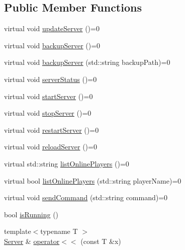\subsection*{Public Member Functions}
\begin{DoxyCompactItemize}
\item 
virtual void \hyperlink{class_minecraft_server_service_1_1_server_a0715bfc451f5abbd2f47d0895e5a2355}{update\+Server} ()=0
\item 
virtual void \hyperlink{class_minecraft_server_service_1_1_server_a58373fb195d9546e4a843ba83d741f36}{backup\+Server} ()=0
\item 
virtual void \hyperlink{class_minecraft_server_service_1_1_server_a3045f178ed407b157a21da66a245e61f}{backup\+Server} (std\+::string backup\+Path)=0
\item 
virtual void \hyperlink{class_minecraft_server_service_1_1_server_af972c950277b436d85513ff5e8003df2}{server\+Status} ()=0
\item 
virtual void \hyperlink{class_minecraft_server_service_1_1_server_ac84f4a395d9680ba4d7405996dcb445c}{start\+Server} ()=0
\item 
virtual void \hyperlink{class_minecraft_server_service_1_1_server_a45fb906a041e3f6c59128a0e9c4cd289}{stop\+Server} ()=0
\item 
virtual void \hyperlink{class_minecraft_server_service_1_1_server_a9cfcad805db7ffd3f5ad10ef7a726cf9}{restart\+Server} ()=0
\item 
virtual void \hyperlink{class_minecraft_server_service_1_1_server_a68757647a604e935d365672b53c82d98}{reload\+Server} ()=0
\item 
virtual std\+::string \hyperlink{class_minecraft_server_service_1_1_server_a86455e8351ecc7af502e681daf023eb3}{list\+Online\+Players} ()=0
\item 
virtual bool \hyperlink{class_minecraft_server_service_1_1_server_adf8951b2a9337983e8ced4b148e1ed5e}{list\+Online\+Players} (std\+::string player\+Name)=0
\item 
virtual void \hyperlink{class_minecraft_server_service_1_1_server_a9c2d6b9b94d490405bf74109e7794cb1}{send\+Command} (std\+::string command)=0
\item 
bool \hyperlink{class_minecraft_server_service_1_1_server_a1954e7c7756cd956e7282887ffca73e4}{is\+Running} ()
\item 
{\footnotesize template$<$typename T $>$ }\\\hyperlink{class_minecraft_server_service_1_1_server}{Server} \& \hyperlink{class_minecraft_server_service_1_1_server_a21a2533f4998ccc209c53a48cdb58718}{operator$<$$<$} (const T \&x)

\end{DoxyCompactItemize}
